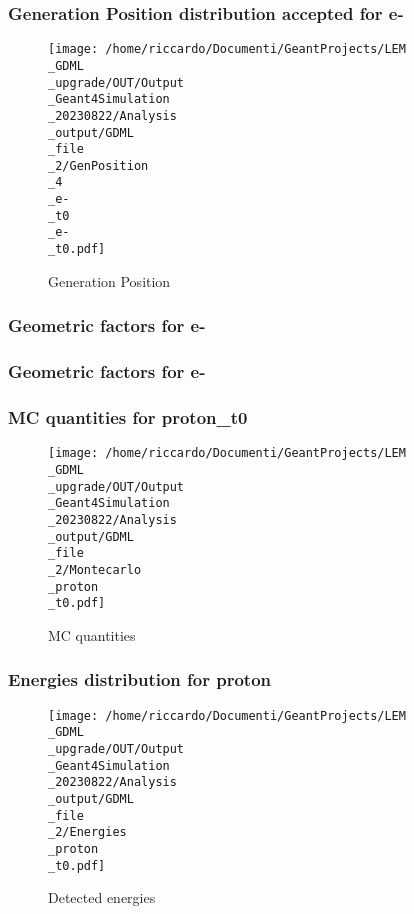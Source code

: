 \documentclass[8pt]{beamer}
\begin{document}
            \begin{frame}
                \frametitle{Generation Position distribution accepted for e-}
            
        \begin{figure}[h]
            \centering
            \texttt{[image: /home/riccardo/Documenti/GeantProjects/LEM\\\_GDML\\\_upgrade/OUT/Output\\\_Geant4Simulation\\\_20230822/Analysis\\\_output/GDML\\\_file\\\_2/GenPosition\\\_4\\\_e-\\\_t0\\\_e-\\\_t0.pdf]}
            \caption{Generation Position}
        \end{figure}
        
            \end{frame}
            
            \begin{frame}
                \frametitle{Geometric factors for e-}
            
            \end{frame}
            
            \begin{frame}
                \frametitle{Geometric factors for e-}
            
            \end{frame}
            
            \begin{frame}
                \frametitle{MC quantities for proton\_t0}
            
        \begin{figure}[h]
            \centering
            \texttt{[image: /home/riccardo/Documenti/GeantProjects/LEM\\\_GDML\\\_upgrade/OUT/Output\\\_Geant4Simulation\\\_20230822/Analysis\\\_output/GDML\\\_file\\\_2/Montecarlo\\\_proton\\\_t0.pdf]}
            \caption{MC quantities}
        \end{figure}
        
            \end{frame}
            
            \begin{frame}
                \frametitle{Energies distribution for proton}
            
        \begin{figure}[h]
            \centering
            \texttt{[image: /home/riccardo/Documenti/GeantProjects/LEM\\\_GDML\\\_upgrade/OUT/Output\\\_Geant4Simulation\\\_20230822/Analysis\\\_output/GDML\\\_file\\\_2/Energies\\\_proton\\\_t0.pdf]}
            \caption{Detected energies}
        \end{figure}
        
            \end{frame}
            
\end{document}
